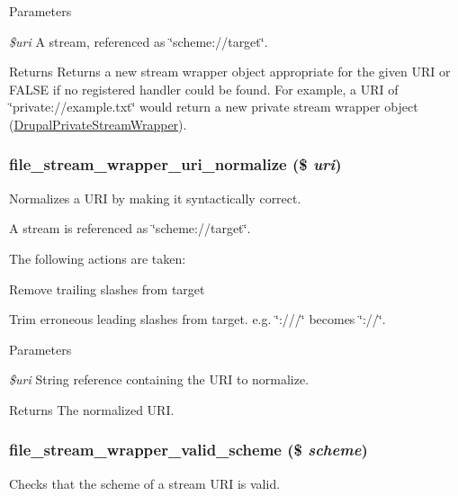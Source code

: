 \begin{DoxyParams}{Parameters}
\item[{\em \$uri}]A stream, referenced as \char`\"{}scheme://target\char`\"{}.\end{DoxyParams}
\begin{DoxyReturn}{Returns}
Returns a new stream wrapper object appropriate for the given URI or FALSE if no registered handler could be found. For example, a URI of \char`\"{}private://example.txt\char`\"{} would return a new private stream wrapper object (\hyperlink{classDrupalPrivateStreamWrapper}{DrupalPrivateStreamWrapper}). 
\end{DoxyReturn}
\hypertarget{group__file_gafd9a522999855ed89191e4e58bbbfeb3}{
\subsubsection[{file\_\-stream\_\-wrapper\_\-uri\_\-normalize}]{\setlength{\rightskip}{0pt plus 5cm}file\_\-stream\_\-wrapper\_\-uri\_\-normalize (\$ {\em uri})}}
\label{group__file_gafd9a522999855ed89191e4e58bbbfeb3}
Normalizes a URI by making it syntactically correct.

A stream is referenced as \char`\"{}scheme://target\char`\"{}.

The following actions are taken:
\begin{DoxyItemize}
\item Remove trailing slashes from target
\item Trim erroneous leading slashes from target. e.g. \char`\"{}:///\char`\"{} becomes \char`\"{}://\char`\"{}.
\end{DoxyItemize}


\begin{DoxyParams}{Parameters}
\item[{\em \$uri}]String reference containing the URI to normalize.\end{DoxyParams}
\begin{DoxyReturn}{Returns}
The normalized URI. 
\end{DoxyReturn}
\hypertarget{group__file_ga12aebc3c6a9eb56d08511e7b968d0cef}{
\subsubsection[{file\_\-stream\_\-wrapper\_\-valid\_\-scheme}]{\setlength{\rightskip}{0pt plus 5cm}file\_\-stream\_\-wrapper\_\-valid\_\-scheme (\$ {\em scheme})}}
\label{group__file_ga12aebc3c6a9eb56d08511e7b968d0cef}
Checks that the scheme of a stream URI is valid.

